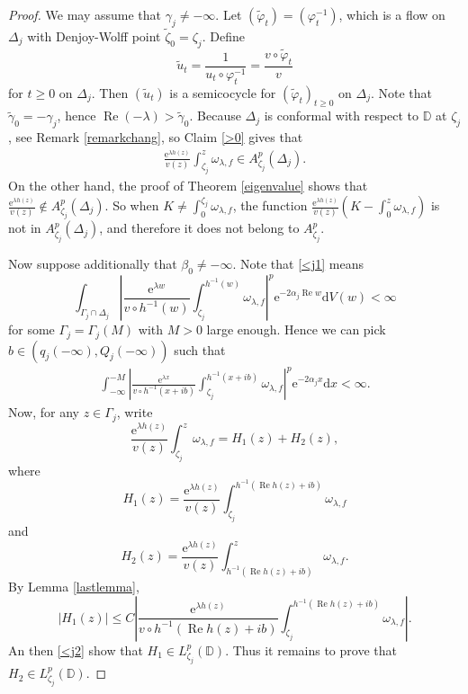\documentclass{amsart}
\theoremstyle{proclaim}
\theoremstyle{fancyproclaim}
\theoremstyle{definition}
\theoremstyle{fancystatement}
\numberwithin{equation}{section}
\begin{document}
\begin{proof}
We may assume that $\gamma_j\ne-\infty.$ Let $(\tilde{\varphi}_t)=(\varphi_t^{-1})$, which is a flow on $\Delta_j$ with Denjoy-Wolff point $\tilde{\zeta}_0=\zeta_j$. Define
$$\tilde{u}_t=\frac{1}{u_t\circ\varphi_t^{-1}}=\frac{v\circ\tilde{\varphi}_t}{v}$$
for $t\geq 0$ on $\Delta_j$. Then $(\tilde{u}_t)$ is a semicocycle for $(\tilde{\varphi}_t)_{t\geq0}$ on $\Delta_j$. Note that $\tilde{\gamma}_0=-\gamma_j$, hence $\operatorname{Re}(-\lambda)>\tilde{\gamma}_0$. Because $\Delta_j$ is conformal with respect to $\mathbb{D}$ at $\zeta_j$, see Remark \ref{remarkchang}, so Claim \ref{>0} gives that
\begin{align}\label{<j1}
\frac{ \mathrm{e}^{\lambda h(z)}}{v(z)}\int^z_{\zeta_j}\omega_{\lambda,f}\in A^p_{\zeta_j}(\Delta_j).
\end{align}
On the other hand, the proof of Theorem \ref{eigenvalue} shows that $\frac{ \mathrm{e}^{\lambda h(z)}}{v(z)}\notin A^p_{\zeta_j}(\Delta_j)$. So when $K\ne\int_0^{\zeta_j}\omega_{\lambda,f}$, the function $\frac{ \mathrm{e}^{\lambda h(z)}}{v(z)}\left(K-\int_0^z\omega_{\lambda,f}\right)$ is not in $A^p_{\zeta_j}(\Delta_j)$, and therefore it does not belong to $A^p_{\zeta_j}$.



Now suppose additionally that  $\beta_0\ne-\infty$. Note that \eqref{<j1} means
$$\int_{\Gamma_j\cap\Delta_j}\left|\frac{ \mathrm{e}^{\lambda w}}{v\circ h^{-1}(w)}\int^{h^{-1}(w)}_{\zeta_j}\omega_{\lambda,f}\right|^p \mathrm{e}^{-2\alpha_j  \operatorname{Re} w} \mathrm{d}V(w)<\infty$$
for some $\Gamma_j=\Gamma_j(M)$ with $M>0$ large enough. Hence we can pick $b\in(q_j(-\infty),Q_j(-\infty))$ such that 
\begin{align}\label{<j2}
\int_{-\infty}^{-M}\left|\frac{ \mathrm{e}^{\lambda x}}{v\circ h^{-1}(x+ib)}\int^{h^{-1}(x+ib)}_{\zeta_j}\omega_{\lambda,f}\right|^p \mathrm{e}^{-2\alpha_j x} \mathrm{d}x<\infty.
\end{align}
Now, for any $z\in\Gamma_j$, write
$$\frac{ \mathrm{e}^{\lambda h(z)}}{v(z)}\int^z_{\zeta_j}\omega_{\lambda,f}=H_1(z)+H_2(z),$$
where
$$H_1(z)=\frac{ \mathrm{e}^{\lambda h(z)}}{v(z)}\int^{h^{-1}(\operatorname{Re}h(z)+ib)}_{\zeta_j}\omega_{\lambda,f}$$
and
$$H_2(z)=\frac{ \mathrm{e}^{\lambda h(z)}}{v(z)}\int^z_{h^{-1}(\operatorname{Re}h(z)+ib)}\omega_{\lambda,f}.$$
By Lemma \ref{lastlemma},
$$|H_1(z)|\leq C\left|\frac{ \mathrm{e}^{\lambda h(z)}}{v\circ h^{-1}(\operatorname{Re}h(z)+ib)}\int^{h^{-1}(\operatorname{Re}h(z)+ib)}_{\zeta_j}\omega_{\lambda,f}\right|.$$
An then \eqref{<j2} show that $H_1\in L^p_{\zeta_j}(\mathbb{D})$. Thus it remains to prove that $H_2\in L^p_{\zeta_j}(\mathbb{D})$.


\end{proof}
\end{document}
